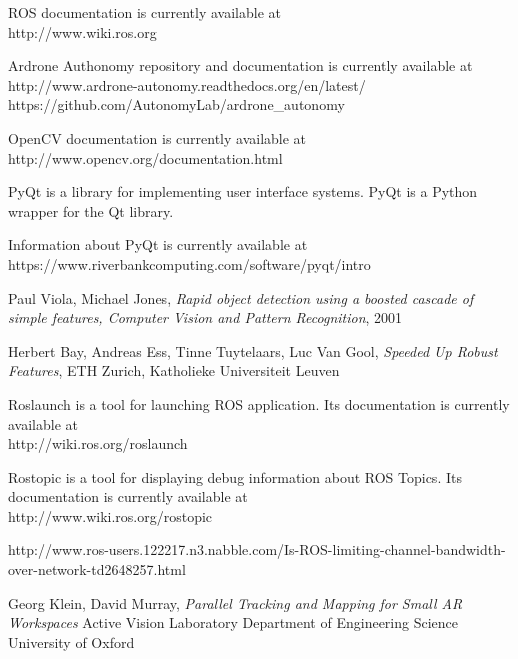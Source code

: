 \documentclass[11pt]{article}
\begin{document}
    \begin{thebibliography}{9}

        ROS documentation is currently available at \\
      http://www.wiki.ros.org

        Ardrone Authonomy repository and documentation is currently available at \\
      http://www.ardrone-autonomy.readthedocs.org/en/latest/ \\
      https://github.com/AutonomyLab/ardrone\_autonomy

        OpenCV documentation is currently available at \\
      http://www.opencv.org/documentation.html

        PyQt is a library for implementing user interface systems.
        PyQt is a Python wrapper for the Qt library.

        Information about PyQt is currently available at \\
        https://www.riverbankcomputing.com/software/pyqt/intro

        Paul Viola, Michael Jones, \emph{Rapid object detection using a boosted cascade of simple features, Computer Vision and Pattern Recognition}, 2001

        Herbert Bay, Andreas Ess, Tinne Tuytelaars, Luc Van Gool, \emph{Speeded Up Robust Features}, ETH Zurich, Katholieke Universiteit Leuven


        Roslaunch is a tool for launching ROS application.
        Its documentation is currently available at \\
        http://wiki.ros.org/roslaunch

        Rostopic is a tool for displaying debug information about ROS Topics.
        Its documentation is currently available at \\
        http://www.wiki.ros.org/rostopic

       http://www.ros-users.122217.n3.nabble.com/Is-ROS-limiting-channel-bandwidth-over-network-td2648257.html

        Georg Klein, David Murray, \emph{Parallel Tracking and Mapping for Small AR Workspaces} Active Vision Laboratory Department of Engineering Science University of Oxford
    

\end{thebibliography}
\end{document}
